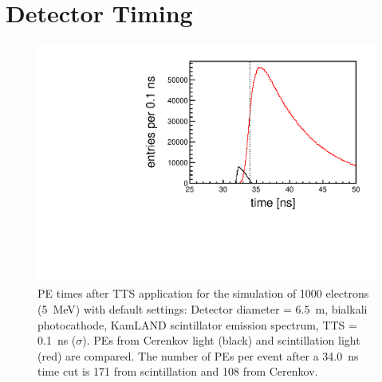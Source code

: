 \documentclass[aps,prc,twocolumn,groupedaddress,showpacs,amsmath,amssymb,floatfix,superscriptaddress]{revtex4}
\begin{document}

\section{Detector Timing}
\label{detector_timing_sec}
\begin{figure}
        \begin{center}
        \includegraphics[scale=0.40]{graphs/6p5Meter_5MeVElectrons_Bialkali_KamlandScintSpec_TIME.pdf}
        \caption[]{PE times after TTS application for the simulation of 1000 electrons (5~MeV) with default settings: Detector diameter = 6.5~m, bialkali photocathode, KamLAND scintillator emission spectrum, TTS = 0.1~ns ($\sigma$). PEs from Cerenkov light (black) and scintillation light (red) are compared. The number of PEs per event after a 34.0~ns time cut is 171 from scintillation and 108 from Cerenkov. \label{6p5Meter_5MeVElectrons_Bialkali_KamlandScintSpec_TIME}}
        \end{center}
\end{figure}
\end{document}
